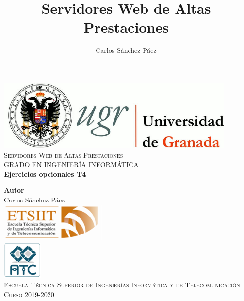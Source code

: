 \documentclass[12pt,spanish]{article}
\title{Servidores Web de Altas Prestaciones}
\author{Carlos Sánchez Páez}
\begin{document}


\begin{titlepage}

 \newlength{\centeroffset}
 \setlength{\centeroffset}{-0.5\oddsidemargin}
 \addtolength{\centeroffset}{0.5\evensidemargin}
 \thispagestyle{empty}

 \noindent\hspace*{\centeroffset}
 \begin{minipage}{\textwidth}

  \centering
  \includegraphics[width=0.9\textwidth]{logo_ugr.jpg}\\[1.4cm]

  \textsc{ \Large Servidores Web de Altas Prestaciones\\[0.2cm]}
  \textsc{GRADO EN INGENIERÍA INFORMÁTICA}\\[1cm]

  {\Huge\bfseries Ejercicios opcionales T4 \\}
 \end{minipage}

 \vspace{1.5cm}
 \noindent\hspace*{\centeroffset}
 \begin{minipage}{\textwidth}
  \centering

  \textbf{Autor}\\ {Carlos Sánchez Páez}\\[2.5ex]
  \includegraphics[width=0.4\textwidth]{etsiit_logo.png}\\[0.1cm]
  \vspace{1.5cm}
  \includegraphics[width=0.15\textwidth]{atc.jpg}\\[0.1cm]
  \vspace{1cm}
  \textsc{Escuela Técnica Superior de Ingenierías Informática y de Telecomunicación}\\
  \vspace{1cm}
  \textsc{Curso 2019-2020}
 \end{minipage}
\end{titlepage}
\thispagestyle{empty}
\newpage
\tableofcontents{}
\newpage
\end{document}
